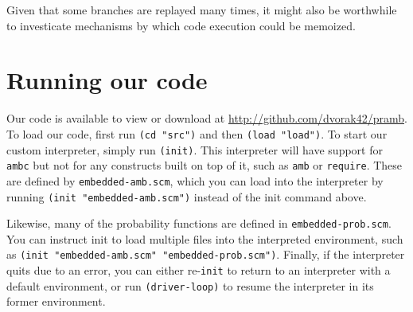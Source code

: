 \documentclass{article}
\begin{document}
Given that some branches are replayed many times, it might also be
worthwhile to investicate mechanisms by which code execution could be
memoized.

\section{Running our code}

Our code is available to view or download at
\url{http://github.com/dvorak42/pramb}. To load our code, first run
\texttt{(cd "src")} and then \texttt{(load "load")}. To start our
custom interpreter, simply run \texttt{(init)}. This interpreter will
have support for \texttt{ambc} but not for any constructs built on top
of it, such as \texttt{amb} or \texttt{require}. These are defined by
\texttt{embedded-amb.scm}, which you can load into the interpreter by
running \texttt{(init "embedded-amb.scm")} instead of the init command
above.

Likewise, many of the probability functions are defined in
\texttt{embedded-prob.scm}. You can instruct init to load multiple
files into the interpreted environment, such as \texttt{(init
  "embedded-amb.scm" "embedded-prob.scm")}. Finally, if the
interpreter quits due to an error, you can either re-\texttt{init} to
return to an interpreter with a default environment, or run
\texttt{(driver-loop)} to resume the interpreter in its former
environment.
\end{document}
